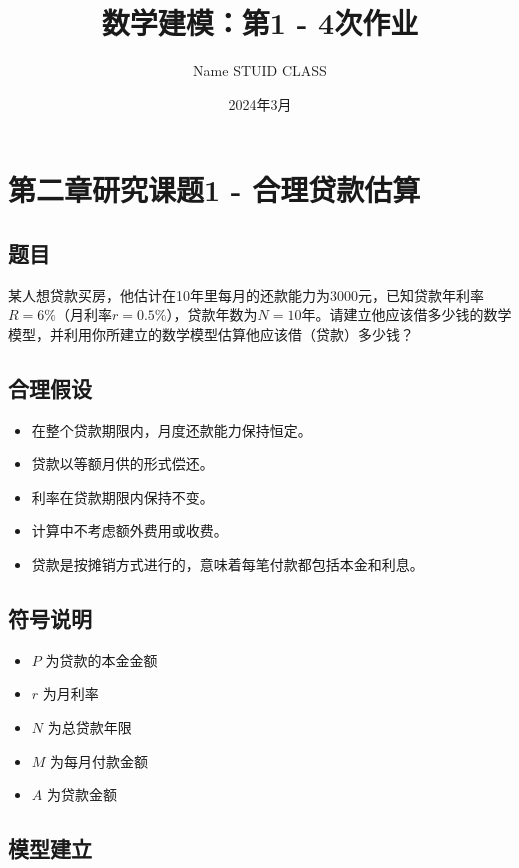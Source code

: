 \documentclass[a4,10pt,zihao=-4]{ctexart}
\begin{document}
\title{数学建模：第1 - 4次作业}

\author{Name STUID CLASS}
\date{2024年3月}
\maketitle
\tableofcontents
\newpage
{}
\newpage

\section{第二章研究课题1 - 合理贷款估算}
\subsection{题目}
某人想贷款买房，他估计在10年里每月的还款能力为3000元，已知贷款年利率$R=6\%$（月利率$r=0.5\%$），贷款年数为$N=10$年。请建立他应该借多少钱的数学模型，并利用你所建立的数学模型估算他应该借（贷款）多少钱？

\subsection{合理假设}

\begin{itemize}
    \item 在整个贷款期限内，月度还款能力保持恒定。
    \item 贷款以等额月供的形式偿还。
    \item 利率在贷款期限内保持不变。
    \item 计算中不考虑额外费用或收费。
    \item 贷款是按摊销方式进行的，意味着每笔付款都包括本金和利息。
\end{itemize}

\subsection{符号说明}
\begin{itemize}
    \item $P$ 为贷款的本金金额
    \item $r$ 为月利率
    \item $N$ 为总贷款年限
    \item $M$ 为每月付款金额
    \item $A$ 为贷款金额
\end{itemize}

\subsection{模型建立}
\end{document}
